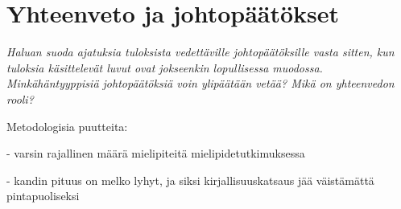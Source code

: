 
\section{Yhteenveto ja johtopäätökset}\label{yhteenveto}


\textit{Haluan suoda ajatuksia tuloksista vedettäville johtopäätöksille vasta sitten, kun tuloksia käsittelevät luvut ovat jokseenkin lopullisessa muodossa. Minkähäntyyppisiä johtopäätöksiä voin ylipäätään vetää? Mikä on yhteenvedon rooli?}

Metodologisia puutteita:

- varsin rajallinen määrä mielipiteitä mielipidetutkimuksessa

- kandin pituus on melko lyhyt, ja siksi kirjallisuuskatsaus jää väistämättä pintapuoliseksi




